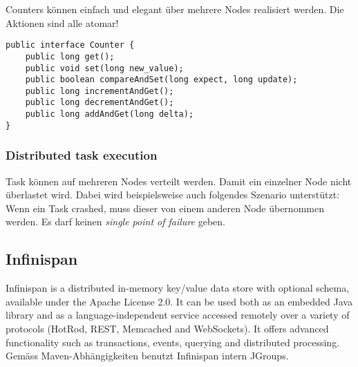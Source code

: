 Counters können einfach und elegant über mehrere Nodes realisiert werden. Die Aktionen sind alle atomar!
	
\begin{lstlisting}[caption=Interface eines Counters]
public interface Counter {
	public long get();
	public void set(long new_value);
	public boolean compareAndSet(long expect, long update);
	public long incrementAndGet();
	public long decrementAndGet();
	public long addAndGet(long delta);
}
\end{lstlisting}
	
\subsubsection{Distributed task execution} 

Task können auf mehreren Nodes verteilt werden. Damit ein einzelner Node nicht überlastet wird. Dabei wird beispielsweise auch folgendes Szenario unterstützt: Wenn ein Task crashed, muss dieser von einem anderen Node übernommen werden. Es darf keinen \emph{single point of failure} geben.

\subsection{Infinispan}
Infinispan is a distributed in-memory key/value data store with optional schema, available under the Apache License 2.0. It can be used both as an embedded Java library and as a language-independent service accessed remotely over a variety of protocols (HotRod, REST, Memcached and WebSockets). It offers advanced functionality such as transactions, events, querying and distributed processing. Gemäss Maven-Abhängigkeiten benutzt Infinispan intern JGroups. 
